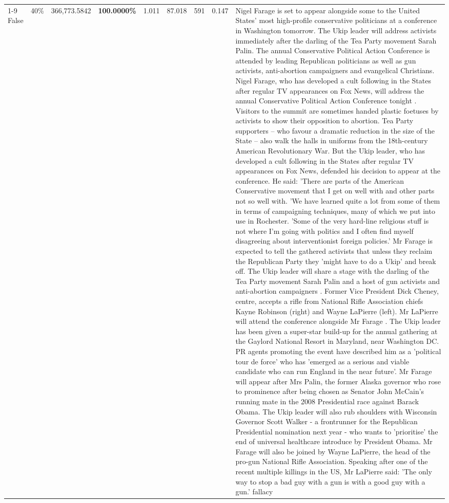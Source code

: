 \begin{table}[H]
\begin{tabular}{lllrlllll}
\cline{1-9} \cline{2-9}
False & 40\% & 366,773.5842 & \bfseries \color{red} 100.0000\% & 1.011 & 87.018 & 591 & 0.147 & Nigel Farage is set to appear alongside some to the United States' most high-profile conservative politicians at a conference in Washington tomorrow. The Ukip leader will address activists immediately after the darling of the Tea Party movement Sarah Palin. The annual Conservative Political Action Conference is attended by leading Republican politicians as well as gun activists, anti-abortion campaigners and evangelical Christians. Nigel Farage, who has developed a cult following in the States after regular TV appearances on Fox News, will address the annual Conservative Political Action Conference tonight . Visitors to the summit are sometimes handed plastic foetuses by activists to show their opposition to abortion. Tea Party supporters – who favour a dramatic reduction in the size of the State – also walk the halls in uniforms from the 18th-century American Revolutionary War. But the Ukip leader, who has developed a cult following in the States after regular TV appearances on Fox News, defended his decision to appear at the conference. He said: 'There are parts of the American Conservative movement that I get on well with and other parts not so well with. 'We have learned quite a lot from some of them in terms of campaigning techniques, many of which we put into use in Rochester. 'Some of the very hard-line religious stuff is not where I'm going with politics and I often find myself disagreeing about interventionist foreign policies.' Mr Farage is expected to tell the gathered activists that unless they reclaim the Republican Party they 'might have to do a Ukip' and break off. The Ukip leader will share a stage with the darling of the Tea Party movement Sarah Palin and a host of gun activists and anti-abortion campaigners . Former Vice President Dick Cheney, centre, accepts a rifle from National Rifle Association chiefs Kayne Robinson (right) and Wayne LaPierre (left). Mr LaPierre will attend the conference alongside Mr Farage . The Ukip leader has been given a super-star build-up for the annual gathering at the Gaylord National Resort in Maryland, near Washington DC. PR agents promoting the event have described him as a 'political tour de force' who has 'emerged as a serious and viable candidate who can run England in the near future'. Mr Farage will appear after Mrs Palin, the former Alaska governor who rose to prominence after being chosen as Senator John McCain's running mate in the 2008 Presidential race against Barack Obama. The Ukip leader will also rub shoulders with Wisconsin Governor Scott Walker - a frontrunner for the Republican Presidential nomination next year - who wants to 'prioritise' the end of universal healthcare introduce by President Obama. Mr Farage will also be joined by Wayne LaPierre, the head of the pro-gun National Rifle Association. Speaking after one of the recent multiple killings in the US, Mr LaPierre said: 'The only way to stop a bad guy with a gun is with a good guy with a gun.' fallacy \\

\end{tabular}
\end{table}
